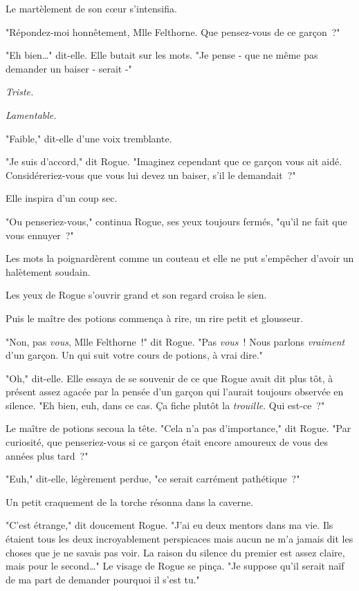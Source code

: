 Le martèlement de son cœur s'intensifia.

"Répondez-moi honnêtement, Mlle Felthorne. Que pensez-vous de ce garçon~?"

"Eh bien…" dit-elle. Elle butait sur les mots. "Je pense - que ne même pas demander un baiser - serait -"

\emph{Triste.}

\emph{Lamentable.}

"Faible," dit-elle d'une voix tremblante.

"Je suis d'accord," dit Rogue. "Imaginez cependant que ce garçon vous ait aidé. Considéreriez-vous que vous lui devez un baiser, s'il le demandait~?"

Elle inspira d'un coup sec.

"Ou penseriez-vous," continua Rogue, ses yeux toujours fermés, "qu'il ne fait que vous ennuyer~?"

Les mots la poignardèrent comme un couteau et elle ne put s'empêcher d'avoir un halètement soudain.

Les yeux de Rogue s'ouvrir grand et son regard croisa le sien.

Puis le maître des potions commença à rire, un rire petit et glousseur.

"Non, pas \emph{vous}, Mlle Felthorne~!" dit Rogue. "Pas \emph{vous}~! Nous parlons \emph{vraiment} d'un garçon. Un qui suit votre cours de potions, à vrai dire."

"Oh," dit-elle. Elle essaya de se souvenir de ce que Rogue avait dit plus tôt, à présent assez agacée par la pensée d'un garçon qui l'aurait toujours observée en silence. "Eh bien, euh, dans ce cas. Ça fiche plutôt la \emph{trouille}. Qui est-ce~?"

Le maître de potions secoua la tête. "Cela n'a pas d'importance," dit Rogue. "Par curiosité, que penseriez-vous si ce garçon était encore amoureux de vous des années plus tard~?"

"Euh," dit-elle, légèrement perdue, "ce serait carrément pathétique~?"

Un petit craquement de la torche résonna dans la caverne.

"C'est étrange," dit doucement Rogue. "J'ai eu deux mentors dans ma vie. Ils étaient tous les deux incroyablement perspicaces mais aucun ne m'a jamais dit les choses que je ne savais pas voir. La raison du silence du premier est assez claire, mais pour le second…" Le visage de Rogue se pinça. "Je suppose qu'il serait naïf de ma part de demander pourquoi il s'est tu."

